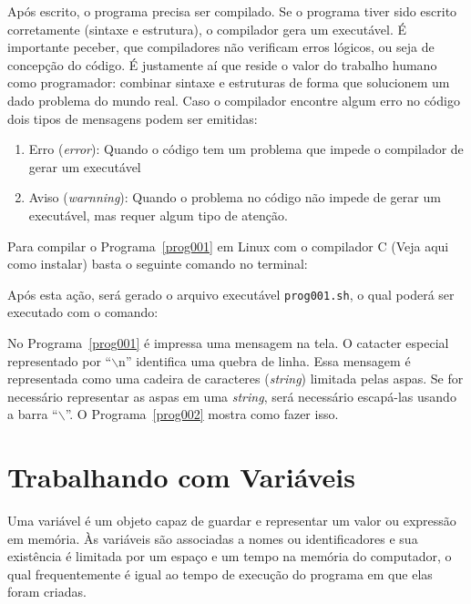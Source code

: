 \documentclass[11pt,fleqn]{book} %
\newcommand{\terminal}[1]{\todo[inline]{\ttfamily{#1}}}
\begin{document}


Após escrito, o programa precisa ser compilado. 
Se o programa tiver sido escrito corretamente (sintaxe e estrutura), o compilador gera um executável.
É importante peceber, que compiladores não verificam erros lógicos, ou seja de concepção do código.
É justamente aí que reside o valor do trabalho humano como programador: combinar sintaxe e estruturas de forma que solucionem um dado problema do mundo real.
Caso o compilador encontre algum erro no código dois tipos de mensagens podem ser emitidas:
\begin{enumerate}
	\item Erro (\textit{error}): Quando o código tem um problema que impede o compilador de gerar um executável
	\item Aviso (\textit{warnning}): Quando o problema no código não impede de gerar um executável, mas requer algum tipo de atenção.
\end{enumerate}

Para compilar o Programa~\ref{prog001} em Linux com o compilador C (Veja aqui como instalar) basta o seguinte comando no terminal: 
\terminal{gcc prog001.c -o prog001.sh}

Após esta ação, será gerado o arquivo executável \texttt{prog001.sh}, o qual poderá ser executado com o comando: 
\terminal{./prog001.sh}

No Programa~\ref{prog001} é impressa uma mensagem na tela. 
O catacter especial representado por ``$\backslash$n'' identifica uma quebra de linha.
Essa mensagem é representada como uma cadeira de caracteres (\textit{string}) limitada pelas aspas.
Se for necessário representar as aspas em uma \textit{string}, será necessário escapá-las usando a barra ``$\backslash$''.
O Programa~\ref{prog002} mostra como fazer isso.



\section{Trabalhando com Variáveis}

Uma variável é um objeto capaz de guardar e representar um valor ou expressão em memória. 
Às variáveis são associadas a nomes ou identificadores e sua existência é limitada por um espaço e um tempo na memória do computador, o qual frequentemente é igual ao tempo de execução do programa em que elas foram criadas.
\end{document}
